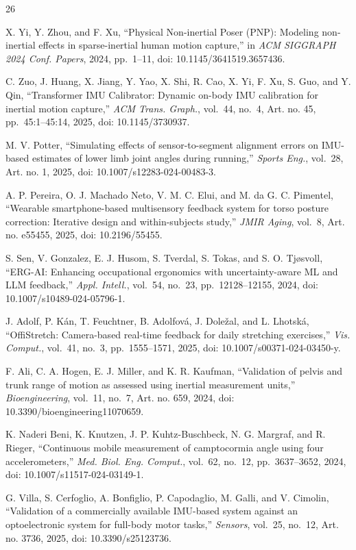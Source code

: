 \documentclass[conference]{IEEEtran}
\begin{document}
\begin{thebibliography}{26}
{
X. Yi, Y. Zhou, and F. Xu,
``Physical Non-inertial Poser (PNP): Modeling non-inertial effects in sparse-inertial human
motion capture,''
in \textit{ACM SIGGRAPH 2024 Conf. Papers}, 2024, pp.~1--11,
doi: 10.1145/3641519.3657436.

C. Zuo, J. Huang, X. Jiang, Y. Yao, X. Shi, R. Cao, X. Yi, F. Xu,
S. Guo, and Y. Qin,
``Transformer IMU Calibrator: Dynamic on-body IMU calibration for inertial motion capture,''
\textit{ACM Trans. Graph.}, vol.~44, no.~4, Art. no. 45,
pp.~45:1--45:14, 2025,
doi: 10.1145/3730937.

M. V. Potter,
``Simulating effects of sensor-to-segment alignment errors on IMU-based estimates of lower
limb joint angles during running,''
\textit{Sports Eng.}, vol.~28, Art. no. 1, 2025,
doi: 10.1007/s12283-024-00483-3.

A. P. Pereira, O. J. Machado Neto, V. M. C. Elui, and M. da G. C. Pimentel,
``Wearable smartphone-based multisensory feedback system for torso posture correction:
Iterative design and within-subjects study,''
\textit{JMIR Aging}, vol.~8, Art. no. e55455, 2025,
doi: 10.2196/55455.

S. Sen, V. Gonzalez, E. J. Husom, S. Tverdal, S. Tokas, and S. O. Tj{\o}svoll,
``ERG-AI: Enhancing occupational ergonomics with uncertainty-aware ML and LLM feedback,''
\textit{Appl. Intell.}, vol.~54, no.~23, pp.~12128--12155, 2024,
doi: 10.1007/s10489-024-05796-1.

J. Adolf, P. K{\'a}n, T. Feuchtner, B. Adolfov{\'a}, J. Dole{\v z}al,
and L. Lhotsk{\'a},
``OffiStretch: Camera-based real-time feedback for daily stretching exercises,''
\textit{Vis. Comput.}, vol.~41, no.~3, pp.~1555--1571, 2025,
doi: 10.1007/s00371-024-03450-y.

F. Ali, C. A. Hogen, E. J. Miller, and K. R. Kaufman,
``Validation of pelvis and trunk range of motion as assessed using inertial measurement
units,''
\textit{Bioengineering}, vol.~11, no.~7, Art. no. 659, 2024,
doi: 10.3390/bioengineering11070659.

K. Naderi Beni, K. Knutzen, J. P. Kuhtz-Buschbeck, N. G. Margraf, and R. Rieger,
``Continuous mobile measurement of camptocormia angle using four accelerometers,''
\textit{Med. Biol. Eng. Comput.}, vol.~62, no.~12,
pp.~3637--3652, 2024,
doi: 10.1007/s11517-024-03149-1.

G. Villa, S. Cerfoglio, A. Bonfiglio, P. Capodaglio, M. Galli, and V. Cimolin,
``Validation of a commercially available IMU-based system against an optoelectronic system
for full-body motor tasks,''
\textit{Sensors}, vol.~25, no.~12, Art. no. 3736, 2025,
doi: 10.3390/s25123736.
}

\end{thebibliography}
\end{document}
